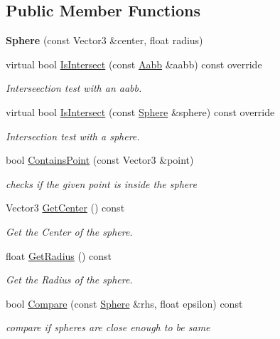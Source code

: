 \subsection*{Public Member Functions}
\begin{DoxyCompactItemize}
\item 
\mbox{\label{classSphere_aca7691f5e4744113f60a5e1ba643c207}} 
{\bfseries Sphere} (const Vector3 \&center, float radius)
\item 
virtual bool \hyperlink{classSphere_aea1571e835842f502a64e4ddb30847e4}{Is\+Intersect} (const \hyperlink{classAabb}{Aabb} \&aabb) const override
\begin{DoxyCompactList}\small\item\em Interseection test with an aabb. \end{DoxyCompactList}\item 
virtual bool \hyperlink{classSphere_aa97baa4e07d8b042f99150df0757d623}{Is\+Intersect} (const \hyperlink{classSphere}{Sphere} \&sphere) const override
\begin{DoxyCompactList}\small\item\em Intersection test with a sphere. \end{DoxyCompactList}\item 
bool \hyperlink{classSphere_afb32becb53288c8be90572047e996042}{Contains\+Point} (const Vector3 \&point)
\begin{DoxyCompactList}\small\item\em checks if the given point is inside the sphere \end{DoxyCompactList}\item 
Vector3 \hyperlink{classSphere_ab0d5d17030115760a276545a1362ce93}{Get\+Center} () const
\begin{DoxyCompactList}\small\item\em Get the Center of the sphere. \end{DoxyCompactList}\item 
float \hyperlink{classSphere_a1be9f865028172ade600ed25ca0aee4f}{Get\+Radius} () const
\begin{DoxyCompactList}\small\item\em Get the Radius of the sphere. \end{DoxyCompactList}\item 
bool \hyperlink{classSphere_adf99590b58fce09c26fa79041efa0b65}{Compare} (const \hyperlink{classSphere}{Sphere} \&rhs, float epsilon) const
\begin{DoxyCompactList}\small\item\em compare if spheres are close enough to be same \end{DoxyCompactList}\end{DoxyCompactItemize}
